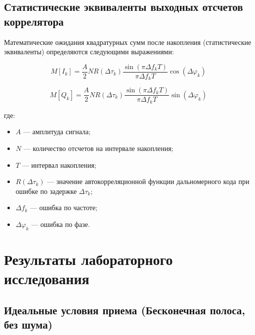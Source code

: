 \subsection{Статистические эквиваленты выходных отсчетов коррелятора}

Математические ожидания квадратурных сумм после накопления (статистические эквиваленты) определяются следующими выражениями:

\begin{equation}
    M[I_k] = \frac{A}{2} N R(\Delta \tau_k) \frac{\sin(\pi \Delta f_k T)}{\pi \Delta f_k T} \cos(\Delta \varphi_k)
\end{equation}

\begin{equation}
    M[Q_k] = \frac{A}{2} N R(\Delta \tau_k) \frac{\sin(\pi \Delta f_k T)}{\pi \Delta f_k T} \sin(\Delta \varphi_k)
\end{equation}

где:
\begin{itemize}
    \item $A$ — амплитуда сигнала;
    \item $N$ — количество отсчетов на интервале накопления;
    \item $T$ — интервал накопления;
    \item $R(\Delta \tau_k)$ — значение автокорреляционной функции дальномерного кода при ошибке по задержке $\Delta \tau_k$;
    \item $\Delta f_k$ — ошибка по частоте;
    \item $\Delta \varphi_k$ — ошибка по фазе.
\end{itemize}

\newpage
\section{Результаты лабораторного исследования}

\subsection{Идеальные условия приема (Бесконечная полоса, без шума)}

